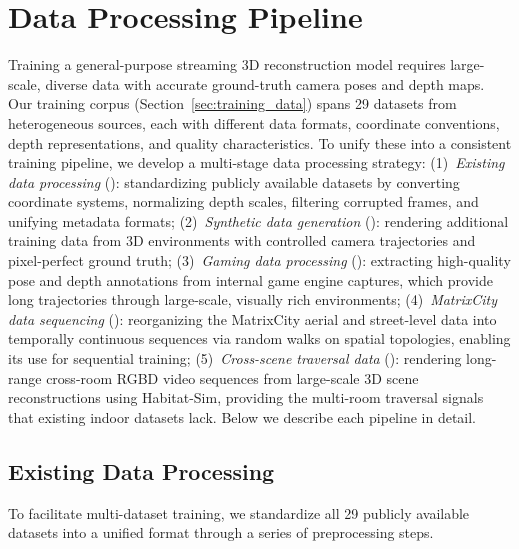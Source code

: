 \appendix
\renewcommand\thesection{\Alph{section}}
\setcounter{section}{0}
\renewcommand\thefigure{S\arabic{figure}}
\setcounter{figure}{0}
\renewcommand\thetable{S\arabic{table}}
\setcounter{table}{0}
\renewcommand\theequation{S\arabic{equation}}
\setcounter{equation}{0}



\section{Data Processing Pipeline}
\label{sec:data_processing}

Training a general-purpose streaming 3D reconstruction model requires
large-scale, diverse data with accurate ground-truth camera poses and
depth maps. Our training corpus (Section~\ref{sec:training_data})
spans 29 datasets from heterogeneous sources, each with different
data formats, coordinate conventions, depth representations, and
quality characteristics. To unify these into a consistent training
pipeline, we develop a multi-stage data processing strategy:
(1)~\textit{Existing data processing} ():
standardizing publicly available datasets by converting
coordinate systems, normalizing depth scales, filtering corrupted
frames, and unifying metadata formats;
(2)~\textit{Synthetic data generation} ():
rendering additional training data from 3D environments with
controlled camera trajectories and pixel-perfect ground truth;
(3)~\textit{Gaming data processing} ():
extracting high-quality pose and depth annotations from internal
game engine captures, which provide long trajectories through
large-scale, visually rich environments;
(4)~\textit{MatrixCity data sequencing} ():
reorganizing the MatrixCity aerial and street-level data into
temporally continuous sequences via random walks on spatial
topologies, enabling its use for sequential training;
(5)~\textit{Cross-scene traversal data} ():
rendering long-range cross-room RGBD video sequences from
large-scale 3D scene reconstructions using Habitat-Sim, providing
the multi-room traversal signals that existing indoor datasets lack.
Below we describe each pipeline in detail.

\subsection{Existing Data Processing}
\label{sec:existing_data}
To facilitate multi-dataset training, we standardize all 29 publicly available datasets into a unified format through a series of preprocessing steps.

